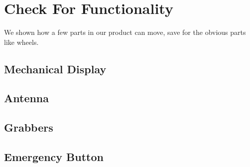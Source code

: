 

\chapter{Check For Functionality}
We shown how a few parts in our product can move, save for the obvious parts like wheels.

\newcommand{\FunctionalComparison}[3]{
     \begin{table}[!h]
     \begin{center}
     \begin{tabular}{ r l }
      \texttt{[image: \#1]} && \texttt{[image: \#2]} \\
     \end{tabular}
     \caption{#3}
     \end{center}
     \end{table}
}

\section{Mechanical Display}
 
\clearpage

\section{Antenna}
 
\clearpage

\section{Grabbers}
 
\clearpage

\section{Emergency Button}

